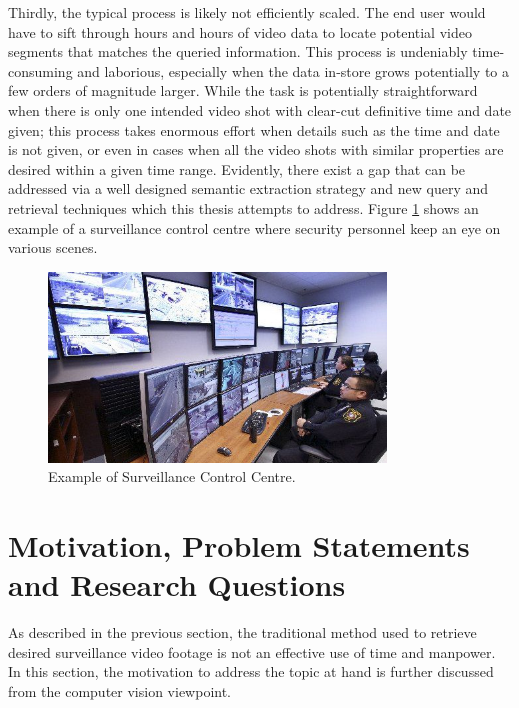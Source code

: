 Thirdly, the typical process is likely not efficiently scaled. The end user would have to sift through hours and hours of video data to locate potential video segments that matches the queried information. This %
process is undeniably time-consuming and laborious, especially when the data in-store grows potentially to a few orders of magnitude larger. While the task is potentially straightforward when there is only one intended video shot with clear-cut definitive time and date given; this process takes enormous effort when details such as the time and date is not given, or even in cases when all the video shots with similar properties are desired within a given time range. Evidently, there exist a gap that can be addressed
via a well designed semantic extraction strategy and new query and retrieval techniques which this thesis attempts to address. Figure \ref{fig:observerdatacenter} shows an example of a surveillance control centre where security personnel keep an eye on various scenes.

\begin{figure}[!hbt]\centering
\includegraphics[width=0.8\textwidth]{image/screenshots/observer.jpg}
  \caption{Example of Surveillance Control Centre. \cite{observerimage}}
\label{fig:observerdatacenter}
\end{figure}

\section{Motivation, Problem Statements and Research Questions}

As described in the previous section, the traditional method used to retrieve desired surveillance video footage is not an effective use of time and manpower. In this section, the motivation to address the topic at hand is further discussed from the computer vision viewpoint.%

